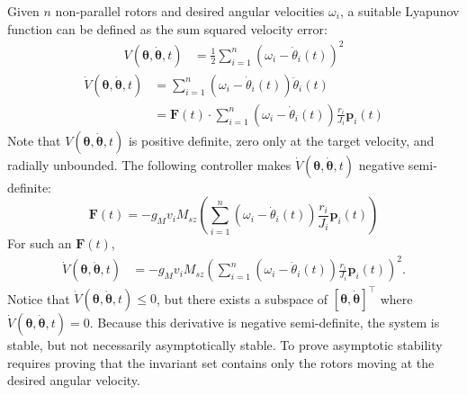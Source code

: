    Given $n$ non-parallel rotors and desired angular velocities $\omega_i$, a suitable Lyapunov function can be defined as the sum squared velocity error:
   \begin{align}
   \label{eq:LyapunovFunction}
   V(\bm{\theta},\dot{\bm{\theta}},t) &= \frac{1}{2} \sum_{i=1}^n \left(  \omega_i - \dot{\theta}_i(t)\right)^2 
      \end{align}
      \begin{align}
   \label{eq:LyapunovFunctionD}
   \dot{V}(\bm{\theta},\dot{\bm{\theta}},t) &=  \sum_{i=1}^n \left( \omega_i - \dot{\theta}_i(t)  \right) \ddot{\theta}_i(t)   \nonumber \\
  &=  \mathbf{F}(t)\cdot \sum_{i=1}^n \left(  \omega_i - \dot{\theta}_i(t) \right) \frac{r_i}{J_i} \mathbf{p}_i(t)
   \end{align}
Note that $V(\bm{\theta},\dot{\bm{\theta}},t)$ is positive definite, zero only at the target velocity, and radially unbounded. The following controller makes $ \dot{V}(\bm{\theta},\dot{\bm{\theta}},t) $ negative semi-definite:
\begin{equation}
\label{eq:velocityControlPolicy}
\mathbf{F}(t) = -g_{M}v_i  M_{sz}\left(  \sum_{i=1}^n \left(  \omega_i - \dot{\theta}_i(t) \right) \frac{r_i}{J_i}  \mathbf{p}_i(t)    \right)
\end{equation}
 For such an $\mathbf{F}(t)$,
   \begin{align*}
  \dot{V}(\bm{\theta},\dot{\bm{\theta}},t) &=  -  g_{M}v_i  M_{sz}\left( \sum_{i=1}^n \left(  \omega_i - \dot{\theta}_i(t) \right) \frac{r_i}{J_i}  \mathbf{p}_i(t) \right)^2.
   \end{align*}
Notice that  $\dot{V}(\bm{\theta},\dot{\bm{\theta}},t)\le0$, but there exists a subspace of $[\bm{\theta}, \dot{\bm{\theta}}]^\intercal$ where $\dot{V}(\bm{\theta},\dot{\bm{\theta}},t)=0$.  Because this derivative is negative semi-definite, the system is stable, but not necessarily asymptotically stable.  To prove asymptotic stability requires proving that the invariant set contains only the rotors moving at the desired angular velocity.  

